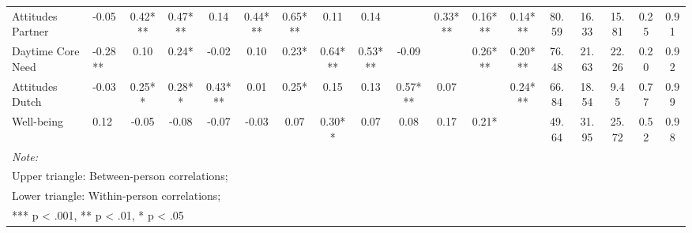 \begin{table}
\begin{minipage}[t][\textheight][t]{\textwidth}
{\begin{tabular}[t]{llcccccccccccccccc}
Attitudes Partner & -0.05 & 0.42*** & 0.47*** & 0.14 & 0.44*** & 0.65*** & 0.11 & 0.14 &  & 0.33*** & 0.16*** & 0.14*** & 80.59 & 16.33 & 15.81 & 0.25 & 0.91\\
Daytime Core Need & -0.28** & 0.10 & 0.24* & -0.02 & 0.10 & 0.23* & 0.64*** & 0.53*** & -0.09 &  & 0.26*** & 0.20*** & 76.48 & 21.63 & 22.26 & 0.20 & 0.92\\
\addlinespace
Attitudes Dutch & -0.03 & 0.25** & 0.28** & 0.43*** & 0.01 & 0.25* & 0.15 & 0.13 & 0.57*** & 0.07 &  & 0.24*** & 66.84 & 18.54 & 9.45 & 0.77 & 0.99\\
Well-being & 0.12 & -0.05 & -0.08 & -0.07 & -0.03 & 0.07 & 0.30** & 0.07 & 0.08 & 0.17 & 0.21* &  & 49.64 & 31.95 & 25.72 & 0.52 & 0.98\\
\bottomrule
\multicolumn{18}{l}{\rule{0pt}{1em}\textit{Note: }}\\
\multicolumn{18}{l}{\rule{0pt}{1em}Upper triangle: Between-person correlations;}\\
\multicolumn{18}{l}{\rule{0pt}{1em}Lower triangle: Within-person correlations;}\\
\multicolumn{18}{l}{\rule{0pt}{1em}*** p < .001, ** p < .01,  * p < .05}\\
\end{tabular}}
\end{minipage}
\end{table}
